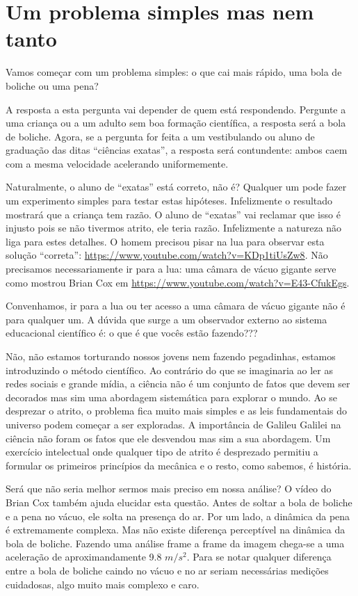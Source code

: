 \section{Um problema simples mas nem tanto}
\label{sec:intro}

Vamos começar com um problema simples: o que cai mais rápido, uma bola de boliche ou uma pena?

A resposta a esta pergunta vai depender de quem está respondendo. Pergunte a uma criança ou a um adulto sem boa formação científica, a resposta será a bola de boliche. Agora, se a pergunta for feita a um vestibulando ou aluno de graduação das ditas ``ciências exatas'', a resposta será contundente: ambos caem com a mesma velocidade acelerando uniformemente.

Naturalmente, o aluno de ``exatas'' está correto, não é? Qualquer um pode fazer um experimento simples para testar estas hipóteses. Infelizmente o resultado mostrará que a criança tem razão. O aluno de ``exatas'' vai reclamar que isso é injusto pois se não tivermos atrito, ele teria razão. Infelizmente a natureza não liga para estes detalhes. O homem precisou pisar na lua para observar esta solução ``correta'': \url{https://www.youtube.com/watch?v=KDp1tiUsZw8}. Não precisamos necessariamente ir para a lua: uma câmara de vácuo gigante serve como mostrou Brian Cox em \url{https://www.youtube.com/watch?v=E43-CfukEgs}.

Convenhamos, ir para a lua ou ter acesso a uma câmara de vácuo gigante não é para qualquer um. A dúvida que surge a um observador externo ao sistema educacional científico é: o que é que vocês estão fazendo???

Não, não estamos torturando nossos jovens nem fazendo pegadinhas, estamos introduzindo o método científico. Ao contrário do que se imaginaria ao ler as redes sociais e grande mídia, a ciência não é um conjunto de fatos que devem ser decorados mas sim uma abordagem sistemática para explorar o mundo. Ao se desprezar o atrito, o problema fica muito mais simples e as leis fundamentais do universo podem começar a ser exploradas. A importância de Galileu Galilei na ciência não foram os fatos que ele desvendou mas sim a sua abordagem. Um exercício intelectual onde qualquer tipo de atrito é desprezado permitiu a formular os primeiros princípios da mecânica e o resto, como sabemos,  é história.


Será que não seria melhor sermos mais preciso em nossa análise? O vídeo do Brian Cox também ajuda elucidar esta questão. Antes de soltar a bola de boliche e a pena no vácuo, ele solta na presença do ar. Por um lado, a dinâmica da pena é extremamente complexa. Mas não existe diferença perceptível na dinâmica da bola de boliche. Fazendo uma análise frame a frame da imagem chega-se a uma aceleração de aproximandamente 9.8 $m/s^2$. Para se notar qualquer diferença entre a bola de boliche caindo no vácuo e no ar seriam necessárias medições cuidadosas, algo muito mais complexo e caro.

